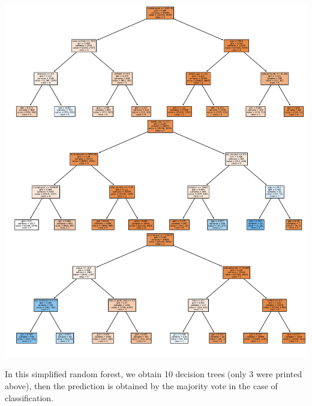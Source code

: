 \documentclass[11pt,a4paper]{article}
\begin{document}
    \noindent
    \begin{center}
        \includegraphics[width = .9 \textwidth]{plot/classification/random_forest.pdf}
    \end{center}
    \noindent
    In this simplified random forest, we obtain 10 decision trees (only 3 were printed above), then the prediction is obtained by the majority vote in the case of classification.
    
    
\end{document}

